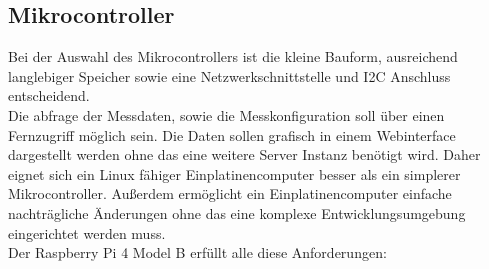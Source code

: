 \subsection{Mikrocontroller}\label{Mikrocontroller}
Bei der Auswahl des Mikrocontrollers ist die kleine Bauform, ausreichend langlebiger Speicher sowie eine Netzwerkschnittstelle und I2C Anschluss entscheidend.\\
Die abfrage der Messdaten, sowie die Messkonfiguration soll über einen Fernzugriff möglich sein. Die Daten sollen grafisch in einem Webinterface dargestellt werden ohne das eine weitere Server Instanz benötigt wird. Daher eignet sich ein Linux fähiger Einplatinencomputer besser als ein simplerer Mikrocontroller.
Außerdem ermöglicht ein Einplatinencomputer einfache nachträgliche Änderungen ohne das eine komplexe Entwicklungsumgebung eingerichtet werden muss.\\

Der Raspberry Pi 4 Model B erfüllt alle diese Anforderungen:

